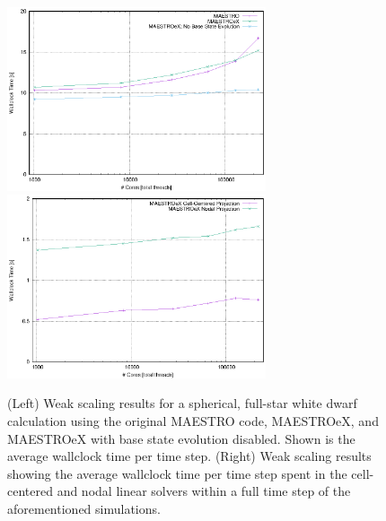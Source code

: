 \documentclass{aastex62}
\begin{document}
\begin{figure}[htb]
\begin{center}
\includegraphics[width=3.0in]{MAESTRO_scaling1.eps} \hspace{0.5em}
\includegraphics[width=3.0in]{MAESTRO_scaling2.eps}
\caption{\label{fig:scaling} (Left) Weak scaling results for a spherical, full-star white dwarf calculation using the original MAESTRO code, MAESTROeX, and MAESTROeX with base state evolution disabled.  Shown is the average wallclock time per time step.
(Right) Weak scaling results showing the average wallclock time per time step spent in the cell-centered and nodal linear solvers within a full time step of the aforementioned simulations.}
\end{center}
\end{figure}
\end{document}
